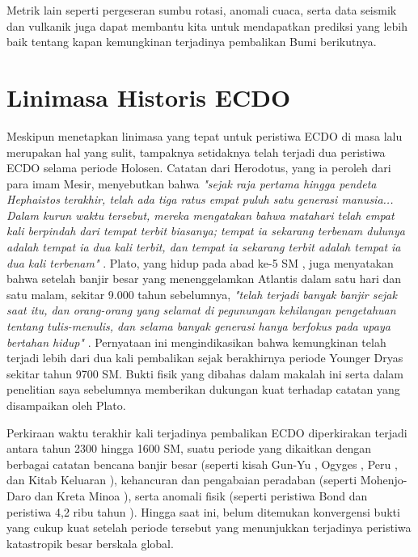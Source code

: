 \documentclass[10pt,twocolumn,letterpaper]{article}
\begin{document}
Metrik lain seperti pergeseran sumbu rotasi, anomali cuaca, serta data seismik dan vulkanik juga dapat membantu kita untuk mendapatkan prediksi yang lebih baik tentang kapan kemungkinan terjadinya pembalikan Bumi berikutnya.

\section{Linimasa Historis ECDO}

Meskipun menetapkan linimasa yang tepat untuk peristiwa ECDO di masa lalu merupakan hal yang sulit, tampaknya setidaknya telah terjadi dua peristiwa ECDO selama periode Holosen. Catatan dari Herodotus, yang ia peroleh dari para imam Mesir, menyebutkan bahwa \textit{"sejak raja pertama hingga pendeta Hephaistos terakhir, telah ada tiga ratus empat puluh satu generasi manusia... Dalam kurun waktu tersebut, mereka mengatakan bahwa matahari telah empat kali berpindah dari tempat terbit biasanya; tempat ia sekarang terbenam dulunya adalah tempat ia dua kali terbit, dan tempat ia sekarang terbit adalah tempat ia dua kali terbenam"} \cite{32}. Plato, yang hidup pada abad ke-5 SM \cite{111}, juga menyatakan bahwa setelah banjir besar yang menenggelamkan Atlantis dalam satu hari dan satu malam, sekitar 9.000 tahun sebelumnya, \textit{"telah terjadi banyak banjir sejak saat itu, dan orang-orang yang selamat di pegunungan kehilangan pengetahuan tentang tulis-menulis, dan selama banyak generasi hanya berfokus pada upaya bertahan hidup"} \cite{112}. Pernyataan ini mengindikasikan bahwa kemungkinan telah terjadi lebih dari dua kali pembalikan sejak berakhirnya periode Younger Dryas sekitar tahun 9700 SM. Bukti fisik yang dibahas dalam makalah ini serta dalam penelitian saya sebelumnya \cite{2} memberikan dukungan kuat terhadap catatan yang disampaikan oleh Plato.

Perkiraan waktu terakhir kali terjadinya pembalikan ECDO diperkirakan terjadi antara tahun 2300 hingga 1600 SM, suatu periode yang dikaitkan dengan berbagai catatan bencana banjir besar (seperti kisah Gun-Yu \cite{113,114,115}, Ogyges \cite{116,117}, Peru \cite{118,119}, dan Kitab Keluaran \cite{120}), kehancuran dan pengabaian peradaban (seperti Mohenjo-Daro \cite{121} dan Kreta Minoa \cite{100,101}), serta anomali fisik (seperti peristiwa Bond \cite{122} dan peristiwa 4,2 ribu tahun \cite{90}). Hingga saat ini, belum ditemukan konvergensi bukti yang cukup kuat setelah periode tersebut yang menunjukkan terjadinya peristiwa katastropik besar berskala global.
\end{document}

